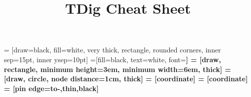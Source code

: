 \documentclass[10pt]{article}
\title{TDig Cheat Sheet}
\begin{document}
\begin{multicols*}{2}

 = [draw=black, fill=white, very thick, rectangle, rounded corners, inner sep=15pt, inner ysep=10pt]
 =[fill=black, text=white, font=\bfseries]
 = [draw, rectangle, minimum height=3em, minimum width=6em, thick]
 = [draw, circle, node distance=1cm, thick]
 = [coordinate]
 = [coordinate]
 = [pin edge={to-,thin,black}]



\end{multicols*}
\end{document}
